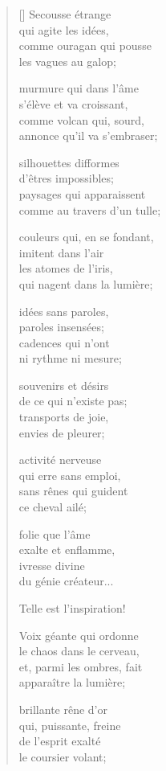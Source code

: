 \documentclass[a4paper,12pt]{book}
\begin{document}
\begin{verse}[\versewidth]
  Secousse étrange \\
  qui agite les idées, \\
  comme ouragan qui pousse \\
  les vagues au galop;

  murmure qui dans l'âme \\
  s'élève et va croissant, \\
  comme volcan qui, sourd, \\
  annonce qu'il va s'embraser;

  silhouettes difformes \\
  d'êtres impossibles; \\
  paysages qui apparaissent \\
  comme au travers d'un tulle;

  couleurs qui, en se fondant, \\
  imitent dans l'air \\
  les atomes de l'iris, \\
  qui nagent dans la lumière;

  idées sans paroles, \\
  paroles insensées; \\
  cadences qui n'ont \\
  ni rythme ni mesure;

  souvenirs et désirs \\
  de ce qui n'existe pas; \\
  transports de joie, \\
  envies de pleurer;

  activité nerveuse \\
  qui erre sans emploi, \\
  sans rênes qui guident \\
  ce cheval ailé;

  folie que l'âme \\
  exalte et enflamme, \\
  ivresse divine \\
  du génie créateur...

  Telle est l'inspiration!

  Voix géante qui ordonne \\
  le chaos dans le cerveau, \\
  et, parmi les ombres, fait \\
  apparaître la lumière;

  brillante rêne d'or \\
  qui, puissante, freine \\
  de l'esprit exalté \\
  le coursier volant;


\end{verse}
\end{document}
